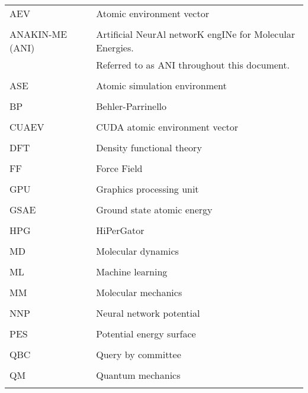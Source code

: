 \singlespacing
\begin{tabular}{l p{5in}} 
AEV & Atomic environment vector\\
\\

ANAKIN-ME (ANI) & Artificial NeurAl networK engINe for Molecular Energies.\\
 & Referred to as ANI throughout this document.\\
\\
ASE & Atomic simulation environment\\
\\
BP & Behler-Parrinello\\
\\
CUAEV & CUDA atomic environment vector\\
\\
DFT & Density functional theory\\
\\
FF & Force Field\\
\\
GPU & Graphics processing unit\\
\\
GSAE & Ground state atomic energy\\
\\
HPG & HiPerGator \\
\\
MD & Molecular dynamics\\
\\
ML & Machine learning\\
\\
MM & Molecular mechanics\\
\\
NNP & Neural network potential\\
\\
PES & Potential energy surface\\
\\
QBC & Query by committee\\
\\
QM & Quantum mechanics\\
\\


\end{tabular}
\doublespacing

